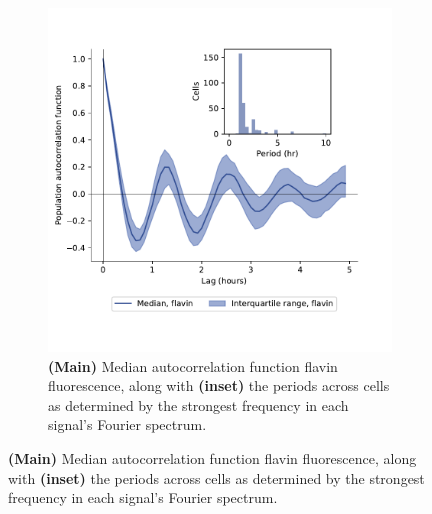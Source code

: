 \begin{figure}
\begin{subfigure}[htpb]{0.4\textwidth}
   \includegraphics[width=\textwidth]{by4741_491_12}
   \caption{
     \textbf{(Main)} Median autocorrelation function flavin fluorescence,
     along with \textbf{(inset)} the periods across cells as determined by the strongest frequency in each signal's Fourier spectrum.
   }
   \label{fig:biology-by4741-sync-acf}
  \end{subfigure}


\end{figure}
